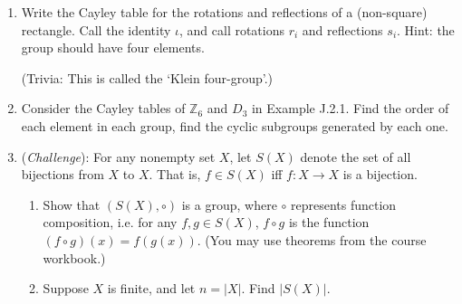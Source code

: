 \documentclass[a4paper,12pt]{article}
\newcommand{\Z}{\mathbb{Z}}
\begin{document}
\pagestyle{myheadings}

\begin{enumerate}
\item
Write the Cayley table for the rotations and reflections of a (non-square)
rectangle. Call the identity $\iota$, and call rotations $r_i$ and reflections
$s_i$.
Hint: the group should have four elements.

(Trivia: This is called the `Klein four-group'.)

\item
Consider the Cayley tables of $\Z_6$ and $D_3$ in Example J.2.1.
Find the order of each element in each group, find the cyclic subgroups
generated by each one.

\item ({\em Challenge}): For any nonempty set $X$, let $S(X)$ denote the set of
all bijections from $X$ to $X$. That is, $f \in S(X)$ iff $f : X \to X$ is a
bijection.
\begin{enumerate}
\item
Show that $(S(X), \circ)$ is a group,
where $\circ$ represents function composition, i.e. for any $f, g \in S(X)$,
$f \circ g$ is the function $(f \circ g)(x) = f(g(x))$.
(You may use theorems from the course workbook.)
\item
Suppose $X$ is finite, and let $n=|X|$. Find $|S(X)|$.
\end{enumerate}
\end{enumerate}
\end{document}
